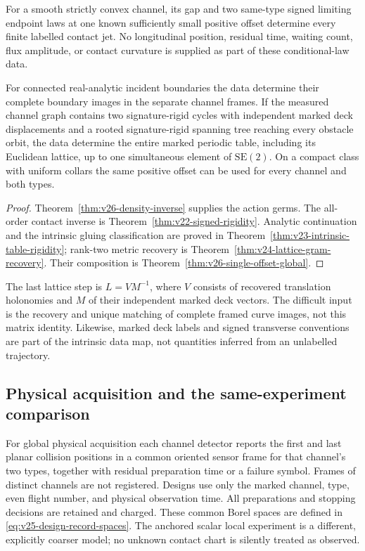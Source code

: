 \begin{theorem}
\label{thm:v26-intro-rigidity}
\label{thm:v25-intro-rigidity}
For a smooth strictly convex channel, its gap and two same-type signed
limiting endpoint laws at one known sufficiently small positive offset
 determine every finite labelled contact jet.  No longitudinal position,
residual time, waiting count, flux amplitude, or contact curvature is
supplied as part of these conditional-law data.

For connected real-analytic incident boundaries the data determine their
complete boundary images in the separate channel frames.  If the measured
channel graph contains two signature-rigid cycles with independent marked
deck displacements and a rooted signature-rigid spanning tree reaching
every obstacle orbit, the data determine the entire marked periodic table,
including its Euclidean lattice, up to one simultaneous element of
\(\mathrm{SE}(2)\).  On a compact class with uniform collars the same
positive offset can be used for every channel and both types.
\end{theorem}

\begin{proof}
Theorem~\ref{thm:v26-density-inverse} supplies the action germs.  The
all-order contact inverse is Theorem~\ref{thm:v22-signed-rigidity}.
Analytic continuation and the intrinsic gluing classification are proved
in Theorem~\ref{thm:v23-intrinsic-table-rigidity}; rank-two metric recovery
is Theorem~\ref{thm:v24-lattice-gram-recovery}.  Their composition is
Theorem~\ref{thm:v26-single-offset-global}.
\end{proof}

The last lattice step is \(L=VM^{-1}\), where \(V\) consists of recovered
translation holonomies and \(M\) of their independent marked deck
vectors.  The difficult input is the recovery and unique matching of
complete framed curve images, not this matrix identity.  Likewise, marked
deck labels and signed transverse conventions are part of the intrinsic
data map, not quantities inferred from an unlabelled trajectory.

\subsection{Physical acquisition and the same-experiment comparison}

For global physical acquisition each channel detector reports the first and
last planar collision positions in a common oriented sensor frame for that
channel's two types, together with residual preparation time or a failure
symbol.  Frames of distinct channels are not registered.  Designs use only
the marked channel, type, even flight number, and physical observation time.
All preparations and stopping decisions are retained and charged.  These
common Borel spaces are defined in \eqref{eq:v25-design-record-spaces}.
The anchored scalar local experiment is a different, explicitly coarser
model; no unknown contact chart is silently treated as observed.

